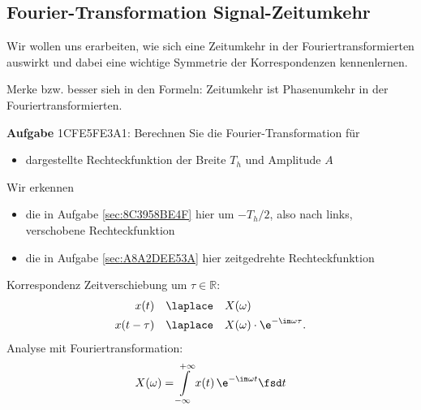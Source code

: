 \clearpage
\subsection{Fourier-Transformation Signal-Zeitumkehr}
\label{sec:1CFE5FE3A1}
\begin{Ziel}
Wir wollen uns erarbeiten, wie sich eine Zeitumkehr in der Fouriertransformierten
auswirkt und dabei eine wichtige Symmetrie der Korrespondenzen kennenlernen.

Merke bzw. besser sieh in den Formeln: Zeitumkehr ist Phasenumkehr in der Fouriertransformierten.
\end{Ziel}

\textbf{Aufgabe} {\tiny 1CFE5FE3A1}: Berechnen Sie die Fourier-Transformation für
\begin{itemize}
\item dargestellte Rechteckfunktion der Breite $T_h$ und Amplitude $A$
\end{itemize}
%
\begin{figure}[h!]
\centering
{}
\end{figure}
%
Wir erkennen
\begin{itemize}
\item die in Aufgabe \ref{sec:8C3958BE4F} hier um $-T_h/2$, also nach links,
verschobene Rechteckfunktion
\item die in Aufgabe \ref{sec:A8A2DEE53A} hier zeitgedrehte Rechteckfunktion
\end{itemize}

\begin{Werkzeug}
Korrespondenz Zeitverschiebung um $\tau\in\mathbb{R}$:
\begin{align}
x(t) & \quad \laplace \quad X(\omega)\\
x(t - \tau) & \quad \laplace \quad X(\omega) \cdot \e^{-\im\omega \tau}.
\end{align}
Analyse mit Fouriertransformation:
\begin{align}
X(\omega) = \int\limits_{-\infty}^{+\infty} x(t) \, \e^{-\im \omega t} \fsd t
\end{align}
\end{Werkzeug}


